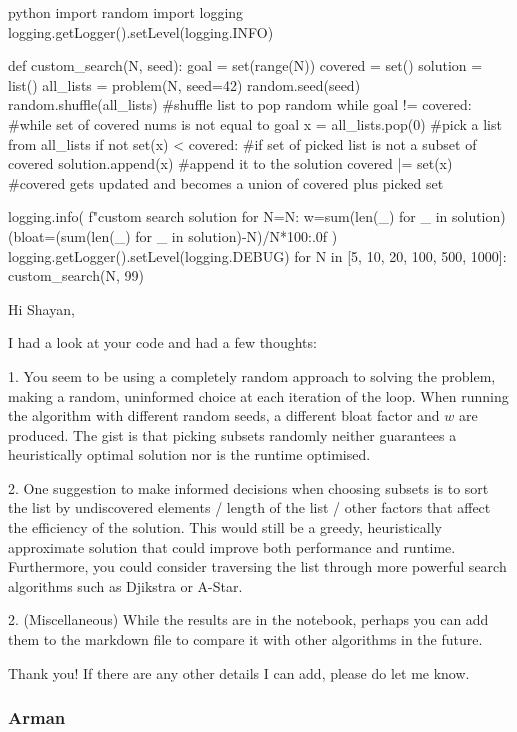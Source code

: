 \begin{mintedbox}{python}
import random
import logging
logging.getLogger().setLevel(logging.INFO)

def custom_search(N, seed):
    goal = set(range(N))
    covered = set()
    solution = list()
    all_lists = problem(N, seed=42)
    random.seed(seed)
    random.shuffle(all_lists) #shuffle list to pop random
    while goal != covered: #while set of covered nums is not equal to goal
        x = all_lists.pop(0) #pick a list from all_lists
        if not set(x) < covered: #if set of picked list is not a subset of covered
            solution.append(x) #append it to the solution
            covered |= set(x) #covered gets updated and becomes a union of covered plus picked set


    logging.info(
        f"custom search solution for N={N}: w={sum(len(_) for _ in solution)} (bloat={(sum(len(_) for _ in solution)-N)/N*100:.0f}%
    )
logging.getLogger().setLevel(logging.DEBUG)
for N in [5, 10, 20, 100, 500, 1000]:
    custom_search(N, 99)
\end{mintedbox}

Hi Shayan,

I had a look at your code and had a few thoughts:

1. You seem to be using a completely random approach to solving the problem, making a random, uninformed choice at each iteration of the loop. When running the algorithm with different random seeds, a different bloat factor and $w$ are produced. The gist is that picking subsets randomly neither guarantees a heuristically optimal solution nor is the runtime optimised.

2. One suggestion to make informed decisions when choosing subsets is to sort the list by undiscovered elements / length of the list / other factors that affect the efficiency of the solution. This would still be a greedy, heuristically approximate solution that could improve both performance and runtime. Furthermore, you could consider traversing the list through more powerful search algorithms such as Djikstra or A-Star.

2. (Miscellaneous) While the results are in the notebook, perhaps you can add them to the markdown file to compare it with other algorithms in the future.

Thank you! If there are any other details I can add, please do let me know.

\subsubsection{Arman}

